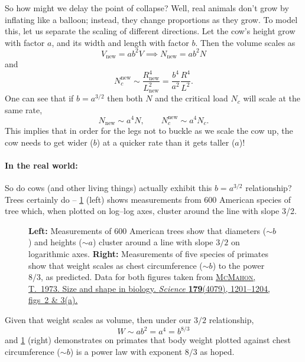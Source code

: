 \documentclass[main.tex]{subfiles}
\begin{document}
So how might we delay the point of collapse? Well, real animals don't grow by inflating like a balloon; instead, they change proportions as they grow. To model this, let us separate the scaling of different directions. Let the cow's height grow with factor $a$, and its width and length with factor $b$. Then the volume scales as
\begin{equation}
V_{\text{new}}  = ab^2V \implies N_\text{new} = ab^2 N
\end{equation}
 and  
\begin{equation}
	N_c^{\text{new}} \sim \frac{R_{\text{new}}^4}{L_{\text{new}}^2} = \frac{b^4}{a^2}\frac{R^4}{L^2}. 
\end{equation}
One can see that if $b=a^{3/2}$ then both $N$ and the critical load $N_c$ will scale at the same rate,
\begin{equation}
	N_\text{new} \sim a^4 N, \qquad N_c^{\text{new}} \sim a^4 N_c.
\end{equation}
This implies that in order for the legs not to buckle as we scale the cow up, the cow needs to get wider ($b$) at a quicker rate than it gets taller ($a$)! 

\paragraph{In the real world:} So do cows (and other living things) actually exhibit this $b=a^{3/2}$ relationship? Trees certainly do -- \cref{fig:tree-sizes} (left) shows measurements from 600 American species of tree which, when plotted on log--log axes, cluster around the line with slope 3/2. 

\begin{figure}
	\begin{center}
	
	
	\end{center}
	\caption{\textbf{Left:} Measurements of 600 American trees show that diameters ($\sim b$) and heights ($\sim a$) cluster around a line with slope $3/2$ on logarithmic axes. \textbf{Right:} Measurements of five species of primates show that weight scales as chest circumference ($\sim b$) to the power $8/3$, as predicted. Data for both figures taken from \href{https://science.sciencemag.org/content/sci/179/4079/1201.full.pdf}{\textsc{McMahon}, T.\ 1973. Size and shape in biology. \emph{Science} \textbf{179}(4079), 1201--1204, figs~2 \& 3(a).}}
	\label{fig:tree-sizes}
\end{figure}

Given that weight scales as volume, then under our $3/2$ relationship, 
\begin{equation}
	W\sim ab^2 = a^4 = b^{8/3}
\end{equation}
and \cref{fig:tree-sizes} (right) demonstrates on primates that body weight plotted against chest circumference ($\sim b$) is a power law with exponent $8/3$ as hoped. 
\end{document}
